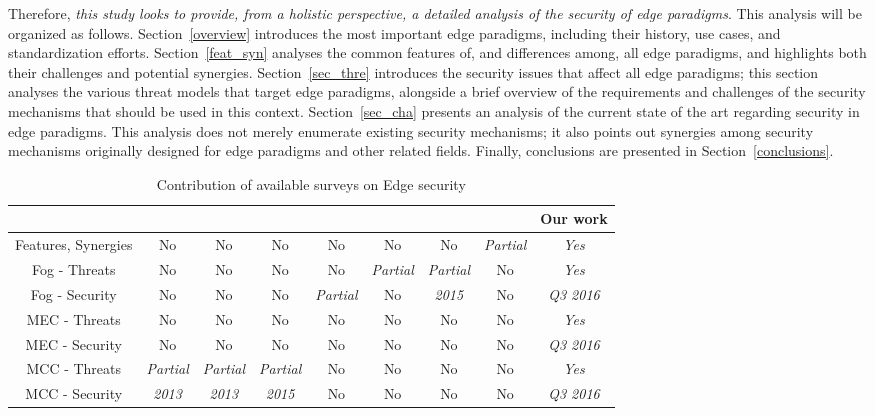 \documentclass[twocolumn,preprint,3p]{elsarticle}
\begin{document}
Therefore, \textit{this study looks to provide, from a holistic perspective, a detailed analysis of the security of edge paradigms}. This analysis will be organized as follows. Section~\ref{overview} introduces the most important edge paradigms, including their history, use cases, and standardization efforts. Section~\ref{feat_syn} analyses the common features of, and differences among, all edge paradigms, and highlights both their challenges and potential synergies. Section~\ref{sec_thre} introduces the security issues that affect all edge paradigms; this section analyses the various threat models that target edge paradigms, alongside a brief overview of the requirements and challenges of the security mechanisms that should be used in this context. Section~\ref{sec_cha} presents an analysis of the current state of the art regarding security in edge paradigms. This analysis does not merely enumerate existing security mechanisms; it also points out synergies among security mechanisms originally designed for edge paradigms and other related fields. Finally, conclusions are presented in Section~\ref{conclusions}.

\begin{table*}[!htb]
\centering
\begin{scriptsize}
\begin{tabular}{|c|c|c|c|c|c|c|c|c|}
  \hline
  & \cite{OPENiD23} & \cite{Suo13} & \cite{Hassan15} & \cite{StojmenovicFSec05} & \cite{Kanghyo15} & \cite{Shanhe15} & \cite{Yucianga15} & Our work \\
  \hline
  Features, Synergies & No & No & No & No & No & No & \textit{Partial} & \textit{Yes} \\
  Fog - Threats & No & No & No & No & \textit{Partial} & \textit{Partial} & No & \textit{Yes} \\
  Fog - Security & No & No & No & \textit{Partial} & No & \textit{2015} & No & \textit{Q3 2016} \\
  MEC - Threats & No & No & No & No & No & No & No & \textit{Yes} \\
  MEC - Security & No & No & No & No & No & No & No & \textit{Q3 2016} \\
  MCC - Threats & \textit{Partial} & \textit{Partial} & \textit{Partial} & No & No & No & No & \textit{Yes} \\
  MCC - Security & \textit{2013} & \textit{2013} & \textit{2015} & No & No & No & No & \textit{Q3 2016} \\
  \hline
\end{tabular}
\end{scriptsize}
\caption{Contribution of available surveys on Edge security}\label{T:Related}
\end{table*}
\end{document}
